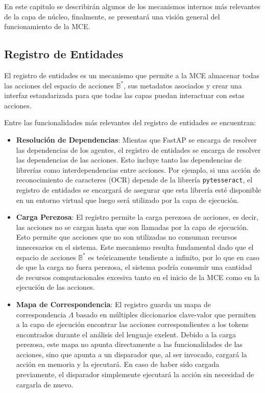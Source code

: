 En este capitulo se describirán algunos de los mecanismos internos más relevantes de 
la capa de núcleo, finalmente, se presentará una visión general del funcionamiento
de la MCE.

\subsection{Registro de Entidades}
El registro de entidades es un mecanismo que permite a la MCE almacenar
todas las acciones del espacio de acciones \(\mathbb{B}^*\), sus metadatos asociados
y crear una interfaz estandarizada para que todas las capas puedan interactuar con estas acciones.

Entre las funcionalidades más relevantes del registro de entidades se encuentran:

\begin{itemize}

    \item \textbf{Resolución de Dependencias}: Mientas que FastAP se encarga de resolver
    las dependencias de los agentes, el registro de entidades se encarga de resolver
    las dependencias de las acciones. Esto incluye tanto las dependencias de librerías
    como interdependencias entre acciones. Por ejemplo, si una acción de reconocimiento de
    caracteres (OCR) depende de la librería \texttt{pytesseract}, el registro de entidades
    se encargará de asegurar que esta librería esté disponible en un entorno virtual
    que luego será utilizado por la capa de ejecución.

    \item \textbf{Carga Perezosa}: El registro permite la carga perezosa de acciones, es decir, las acciones
    no se cargan hasta que son llamadas por la capa de ejecución. Esto permite que acciones que no son utilizadas no
    consuman recursos innecesarios en el sistema. Este mecanismo resulta fundamental dado que el espacio de acciones \(\mathbb{B}^*\) 
    es teóricamente tendiente a infinito, por lo que en caso de que la carga no fuera perezosa, el sistema
    podría consumir una cantidad de recursos computacionales excesiva tanto en el inicio de la MCE como en la ejecución de las acciones.

    \item \textbf{Mapa de Correspondencia}: El registro guarda un mapa de correspondencia \(\Lambda\) basado en múltiples
    diccionarios clave-valor que permiten a la capa de ejecución encontrar las acciones correspondientes a los tokens
    encontrados durante el análisis del lenguaje exelent. Debido a la carga perezosa, este mapa no apunta directamente a las funcionalidades
    de las acciones, sino que apunta a un disparador que, al ser invocado, cargará la acción en memoria y la ejecutará. En caso de 
    haber sido cargada previamente, el disparador simplemente ejecutará la acción sin necesidad de cargarla de nuevo.


\end{itemize}
